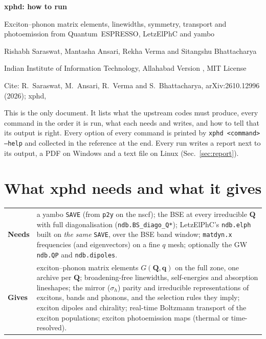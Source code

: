 \documentclass[10pt,a4paper]{article}
\newcommand{\bQ}{\mathbf{Q}}
\newcommand{\bq}{\mathbf{q}}
\begin{document}
\thispagestyle{fancy}
{\color{ink}\fontsize{26}{30}\selectfont\bfseries xphd: how to run\par}
\vspace{0.8ex}
{\raggedright\color{accent}\large Exciton--phonon matrix elements, linewidths, symmetry, transport and photoemission from Quantum~ESPRESSO, LetzElPhC and yambo\par}
\vspace{1.0ex}
{Rishabh Saraswat, Mantasha Ansari, Rekha Verma and Sitangshu Bhattacharya\par}
{\small Indian Institute of Information Technology, Allahabad \quad\textperiodcentered\quad Version \xphdversion, MIT License\par}
{\small Cite: R.~Saraswat, M.~Ansari, R.~Verma and S.~Bhattacharya, arXiv:2610.12996 (2026); xphd, \xphdsoftware\par}
\vspace{1.5ex}

\begin{note}
This is the only document. It lists what the upstream codes must produce, every command in the order it is run, what each
needs and writes, and how to tell that its output is right. Every option of every command is printed by
\texttt{xphd <command> --help} and collected in the reference at the end. Every run writes a report next to its output, a PDF
on Windows and a text file on Linux (Sec.~\ref{sec:report}).
\end{note}

{\setlength{\parskip}{0pt}\small\tableofcontents}

\section{What xphd needs and what it gives}
\begin{tabularx}{\linewidth}{>{\bfseries}p{3.2cm}X}
Needs & a yambo \texttt{SAVE} (from \texttt{p2y} on the nscf); the BSE at every irreducible $\bQ$ with full diagonalisation
(\texttt{ndb.BS\_diago\_Q*}); LetzElPhC's \texttt{ndb.elph} built on \emph{the same} \texttt{SAVE}, over the BSE band window;
\texttt{matdyn.x} frequencies (and eigenvectors) on a fine $q$ mesh; optionally the GW \texttt{ndb.QP} and \texttt{ndb.dipoles}.\\
Gives & exciton--phonon matrix elements $G(\bQ,\bq)$ on the full zone, one archive per $\bQ$; broadening-free linewidths,
self-energies and absorption lineshapes; the mirror ($\sigma_h$) parity and irreducible representations of excitons, bands
and phonons, and the selection rules they imply; exciton dipoles and chirality; real-time Boltzmann transport of the exciton
populations; exciton photoemission maps (thermal or time-resolved).\\
\end{tabularx}
\end{document}
